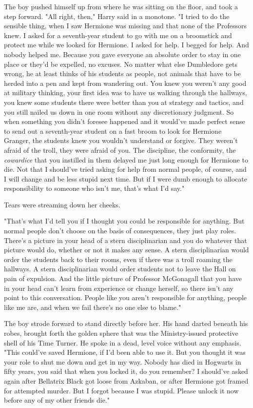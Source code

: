 The boy pushed himself up from where he was sitting on the floor, and took a 
step forward. "All right, then," Harry said in a monotone. "I tried to do the 
sensible thing, when I saw Hermione was missing and that none of the Professors 
knew. I asked for a seventh-year student to go with me on a broomstick and 
protect me while we looked for Hermione. I asked for help. I begged for help. 
And nobody helped me. Because you gave everyone an absolute order to stay in 
one place or they'd be expelled, no excuses. No matter what else Dumbledore 
gets wrong, he at least thinks of his students as people, not animals that have 
to be herded into a pen and kept from wandering out. You knew you weren't any 
good at military thinking, your first idea was to have us walking through the 
hallways, you knew some students there were better than you at strategy and 
tactics, and you still nailed us down in one room without any discretionary 
judgment. So when something you didn't foresee happened and it would've made 
perfect sense to send out a seventh-year student on a fast broom to look for 
Hermione Granger, the students knew you wouldn't understand or forgive. They 
weren't afraid of the troll, they were afraid of you. The discipline, the 
conformity, the \emph{cowardice} that you instilled in them delayed me just 
long enough for Hermione to die. Not that I should've tried asking for help 
from normal people, of course, and I will change and be less stupid next time. 
But if I were dumb enough to allocate responsibility to someone who isn't me, 
that's what I'd say."

Tears were streaming down her cheeks.

"That's what I'd tell you if I thought you could be responsible for anything. 
But normal people don't choose on the basis of consequences, they just play 
roles. There's a picture in your head of a stern disciplinarian and you do 
whatever that picture would do, whether or not it makes any sense. A stern 
disciplinarian would order the students back to their rooms, even if there was 
a troll roaming the hallways. A stern disciplinarian would order students not 
to leave the Hall on pain of expulsion. And the little picture of Professor 
McGonagall that you have in your head can't learn from experience or change 
herself, so there isn't any point to this conversation. People like you aren't 
responsible for anything, people like me are, and when we fail there's no one 
else to blame."

The boy strode forward to stand directly before her. His hand darted beneath 
his robes, brought forth the golden sphere that was the Ministry-issued 
protective shell of his Time Turner. He spoke in a dead, level voice without 
any emphasis. "This could've saved Hermione, if I'd been able to use it. But 
you thought it was your role to shut me down and get in my way. Nobody has died 
in Hogwarts in fifty years, you said that when you locked it, do you remember? 
I should've asked again after Bellatrix Black got loose from Azkaban, or after 
Hermione got framed for attempted murder. But I forgot because I was stupid. 
Please unlock it now before any of my other friends die."

